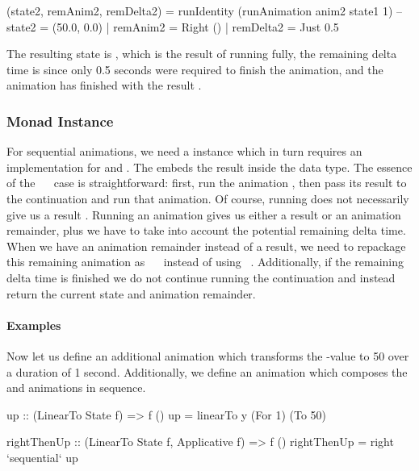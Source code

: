 \begin{code}
(state2, remAnim2, remDelta2) =
  runIdentity (runAnimation anim2 state1 1)
-- state2 = (50.0, 0.0) | remAnim2 = Right () | remDelta2 = Just 0.5
\end{code}

The resulting state is , which is the result of running  fully, the remaining delta time is  since only 0.5 seconds were required to finish the animation, and the animation has finished with the result \hs{()}.

\subsubsection{Monad Instance}

For sequential animations, we need a  instance which in turn requires an implementation for  and \hs{>>=}. The  embeds the result  inside the  data type. The essence of the ~\hs{>>=}~ case is straightforward: first, run the animation , then pass its result to the continuation  and run that animation. Of course, running  does not necessarily give us a result . Running an animation gives us either a result or an animation remainder, plus we have to take into account the potential remaining delta time. When we have an animation remainder instead of a result, we need to repackage this remaining animation as ~\hs{>>=}~ instead of using ~. Additionally, if the remaining delta time is finished we do not continue running the continuation and instead return the current state and animation remainder.

\paragraph{Examples}

Now let us define an additional animation  which transforms the -value to 50 over a duration of 1 second. Additionally, we define an animation  which composes the  and  animations in sequence.

\begin{code}
up :: (LinearTo State f) => f ()
up = linearTo y (For 1) (To 50)

rightThenUp :: (LinearTo State f, Applicative f) => f ()
rightThenUp = right `sequential` up
\end{code}

